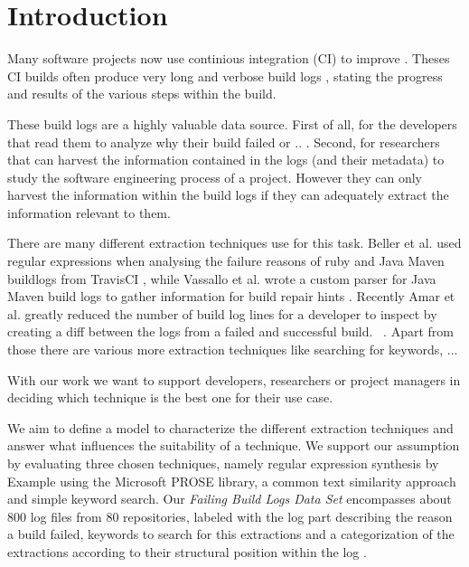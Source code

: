 \documentclass[\myrootdir/main.tex]{subfiles}
\begin{document}
\chapter{Introduction}
Many software projects now use continious integration (CI) to improve . Theses CI builds often produce very long and verbose build logs , stating the progress and results of the various steps within the build.

These build logs are a highly valuable data source. First of all, for the developers that read them to analyze why their build failed or .. . Second, for researchers that can harvest the information contained in the logs (and their metadata) to study the software engineering process of a project. However they can only harvest the information within the build logs if they can adequately extract the information relevant to them.

There are many different extraction techniques use for this task. Beller et al.  used regular expressions when analysing the failure reasons of ruby and Java Maven buildlogs from TravisCI \cite{beller2017oops}, while Vassallo et al. wrote a custom parser for Java Maven build logs to gather information for build repair hints \cite{vassallo2018un-break}. Recently Amar et al. greatly reduced the number of build log lines for a developer to inspect by creating a diff between the logs from a failed and successful build.~\cite{amar2019mining} . Apart from those there are various more extraction techniques like searching for keywords, ...  

With our work we want to support developers, researchers or project managers in deciding which technique is the best one for their use case. 


We aim to define a model to characterize the different extraction techniques and answer what influences the suitability of a technique. We support our assumption by evaluating three chosen techniques, namely regular expression synthesis by Example using the Microsoft PROSE library, a common text similarity approach and simple keyword search. Our \emph{Failing Build Logs Data Set} encompasses about 800 log files from 80 repositories, labeled with the log part describing the reason a build failed, keywords to search for this extractions and a categorization of the extractions according to their structural position within the log . 
\end{document}
